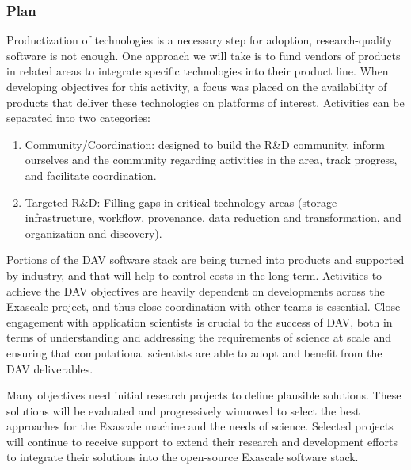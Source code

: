 \subsubsection{Plan}
Productization of technologies is a necessary step for adoption, research-quality software is not enough. One approach we will take is to fund vendors of products in related areas to integrate specific technologies into their product line. When developing objectives for this activity, a focus was placed on the availability of products that deliver these technologies on platforms of interest. Activities can be separated into two categories:
\begin{enumerate}
\item Community/Coordination: designed to build the R\&D community, inform ourselves and the community regarding activities in the area, track progress, and facilitate coordination.
\item Targeted R\&D: Filling gaps in critical technology areas (storage infrastructure, workflow, provenance, data reduction and transformation, and organization and discovery).
\end{enumerate}

Portions of the DAV software stack are being turned into products and supported by industry, and that will help to control costs in the long term. Activities to achieve the DAV objectives are heavily dependent on developments across the Exascale project, and thus close coordination with other teams is essential. Close engagement with application scientists is crucial to the success of DAV, both in terms of understanding and addressing the requirements of science at scale and ensuring that computational scientists are able to adopt and benefit from the DAV deliverables.

Many objectives need initial research projects to define plausible solutions. These solutions will be evaluated and progressively winnowed to select the best approaches for the Exascale machine and the needs of science. Selected projects will continue to receive support to extend their research and development efforts to integrate their solutions into the open-source Exascale software stack. 

